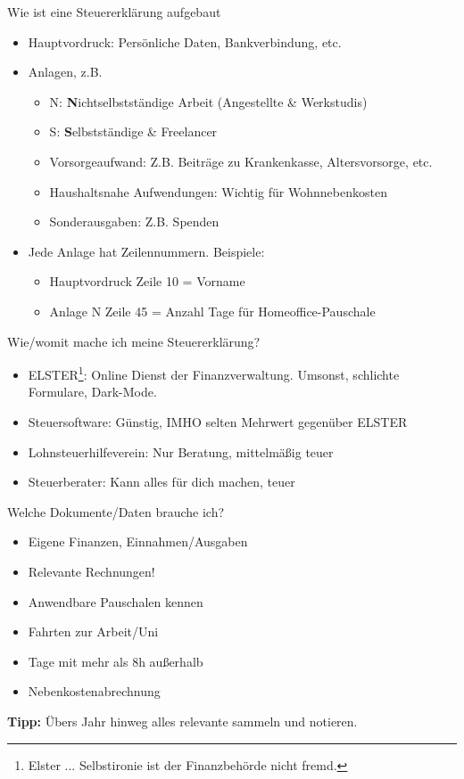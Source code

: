 \documentclass{beamer}
\begin{document}
			\begin{frame}{Wie ist eine Steuererklärung aufgebaut}
				\begin{itemize}
					\item Hauptvordruck: Persönliche Daten, Bankverbindung, etc.
					\item Anlagen, z.B.
					\begin{itemize}
						\item N: \textbf{N}ichtselbstständige Arbeit (Angestellte \& Werkstudis)
						\item S: \textbf{S}elbstständige \& Freelancer
						\item Vorsorgeaufwand: Z.B. Beiträge zu Krankenkasse, Altersvorsorge, etc.
						\item Haushaltsnahe Aufwendungen: Wichtig für Wohnnebenkosten
						\item Sonderausgaben: Z.B. Spenden
					\end{itemize}
					\item Jede Anlage hat Zeilennummern. Beispiele:
					\begin{itemize}
						\item Hauptvordruck Zeile 10 = Vorname
						\item Anlage N Zeile 45 = Anzahl Tage für Homeoffice-Pauschale
					\end{itemize}
				\end{itemize}
			\end{frame}

			\begin{frame}{Wie/womit mache ich meine Steuererklärung?}
				\begin{itemize}
					\item ELSTER\footnote{Elster ... Selbstironie ist der Finanzbehörde nicht fremd.}: Online Dienst der Finanzverwaltung. Umsonst, schlichte Formulare, Dark-Mode.
					\item Steuersoftware: Günstig, IMHO selten Mehrwert gegenüber ELSTER
					\item Lohnsteuerhilfeverein: Nur Beratung, mittelmäßig teuer
					\item Steuerberater: Kann alles für dich machen, teuer
				\end{itemize}
			\end{frame}
		
			\begin{frame}{Welche Dokumente/Daten brauche ich?}
				\begin{itemize}
					\item Eigene Finanzen, Einnahmen/Ausgaben
					\item Relevante Rechnungen!
					\item Anwendbare Pauschalen kennen
					\item Fahrten zur Arbeit/Uni
					\item Tage mit mehr als 8h außerhalb
					\item Nebenkostenabrechnung
				\end{itemize}\n
				\textbf{Tipp:} Übers Jahr hinweg alles relevante sammeln und notieren.
			\end{frame}
			
\end{document}
